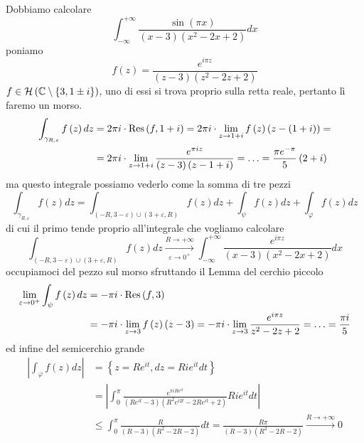 Dobbiamo calcolare
\begin{equation*}
\int ^{ + \infty }_{ - \infty }\frac{\sin\left(\pi x\right)}{\left(x - 3\right)\left(x^{2} - 2x + 2\right)} dx
\end{equation*}
poniamo
\begin{equation*}
f\left(z\right) = \frac{e^{i\pi z}}{\left(z - 3\right)\left(z^{2} - 2z + 2\right)}
\end{equation*}
$f\in \mathcal{H} \left(\mathbb{C}  \setminus \left\{3,1\pm i\right\}\right)$, uno di essi si trova proprio sulla retta reale, pertanto lì faremo un morso.
\begin{align*}
\int _{\gamma _{R,\varepsilon }} f\left(z\right) dz & = 2\pi i\cdot \operatorname{Res} \left(f,1 + i\right) = 2\pi i\cdot \lim _{z\rightarrow 1 + i} f\left(z\right)\left(z - \left(1 + i\right)\right) = \\
 & = 2\pi i\cdot \lim _{z\rightarrow 1 + i}\frac{e^{\pi iz}}{\left(z - 3\right)\left(z - 1 + i\right)} = \dotsc = \frac{\pi e^{ - \pi }}{5}\left(2 + i\right)
\end{align*}
ma questo integrale possiamo vederlo come la somma di tre pezzi
\begin{equation*}
\int _{\gamma _{R,\varepsilon }} f\left(z\right) dz = \int _{\left(- R,3 - \varepsilon \right) \cup \left(3 + \varepsilon ,R\right)} f\left(z\right) dz + \int _{\psi } f\left(z\right) dz + \int _{\varphi } f\left(z\right) dz
\end{equation*}
di cui il primo tende proprio all'integrale che vogliamo calcolare
\begin{equation*}
\int _{\left(- R,3 - \varepsilon \right) \cup \left(3 + \varepsilon ,R\right)} f\left(z\right) dz\xrightarrow[\varepsilon \rightarrow 0^{ + }]{R\rightarrow + \infty }\int ^{ + \infty }_{ - \infty }\frac{e^{i\pi z}}{\left(x - 3\right)\left(x^{2} - 2x + 2\right)} dx
\end{equation*}
occupiamoci del pezzo sul morso sfruttando il Lemma del cerchio piccolo
\begin{align*}
\lim _{\varepsilon \rightarrow 0^{ + }}\int _{\psi } f\left(z\right) dz & = - \pi i\cdot \operatorname{Res} \left(f,3\right)\\
 & = - \pi i\cdot \lim _{z\rightarrow 3} f\left(z\right)\left(z - 3\right) = - \pi i\cdot \lim _{z\rightarrow 3}\frac{e^{i\pi z}}{z^{2} - 2z + 2} = \dotsc = \frac{\pi i}{5}
\end{align*}
ed infine del semicerchio grande
\begin{align*}
\left| \int _{\varphi } f\left(z\right) dz\right|  & = \left\{z = Re^{it} ,dz = Rie^{it} dt\right\}\\
 & = \left| \int ^{\pi }_{0}\frac{e^{\pi iRe^{it}}}{\left(Re^{it} - 3\right)\left(R^{2} e^{i2t} - 2Re^{it} + 2\right)} Rie^{it} dt\right| \\
 & \leq \int ^{\pi }_{0}\frac{R}{\left(R - 3\right)\left(R^{2} - 2R - 2\right)} dt = \frac{R\pi }{\left(R - 3\right)\left(R^{2} - 2R - 2\right)}\xrightarrow{R\rightarrow + \infty } 0
\end{align*}
